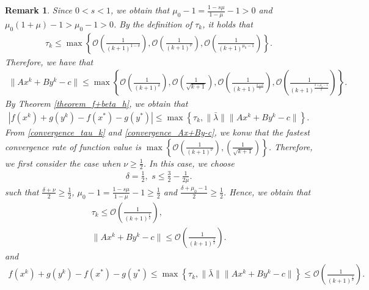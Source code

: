 \documentclass{article}
\numberwithin{equation}{section}
\newtheorem{remark}{Remark}[theorem]
\begin{document}
\begin{remark}
Since $0<s<1$, we obtain that $\mu_0 -1 =\frac{1-s\mu}{1-\mu}-1 >0$ and $\mu_0(1+\mu)-1>\mu_0-1>0$. 
By the definition of $\tau_k$, it holds that 
\begin{align}
    \tau_k \leq \max\left\{ \mathcal{O}\left(\frac{1}{(k+1)^{1-\delta}}\right), 
    \mathcal{O}\left(\frac{1}{(k+1)^{\nu}}\right),\mathcal{O}\left(\frac{1}{(k+1)^{\mu_0-1}}\right) \right\}. \label{convergence_tau_k}
\end{align}
Therefore, we have that
\begin{align}
    \|Ax^k+ By^k -c\rVert \leq \max\left\{\mathcal{O}\left( \frac{1}{(k+1)^{\delta}} \right), 
    \mathcal{O}\left( \frac{1}{\sqrt{k+1}}\right), \mathcal{O}\left( \frac{1}{(k+1)^{\frac{\delta+\nu}{2}}}\right), 
    \mathcal{O}\left( \frac{1}{(k+1)^{\frac{\delta+\mu_0-1}{2}}}\right)\right\}. \label{convergence_Ax+By-c}
\end{align} 
By Theorem \ref{theorem_f+beta_h}, we obtain that 
\begin{align}
    \left|f(x^k)+g(y^k) -f(x^*) -g(y^*)\right| \leq \max\left\{ \tau_k, \|\bar{\lambda}\rVert\|Ax^k+By^k-c\rVert \right\}. \nonumber
\end{align}
From \eqref{convergence_tau_k} and \eqref{convergence_Ax+By-c}, we konw that the fastest convergence rate 
of function value is $\max\left\{ \mathcal{O}\left( \frac{1}{(k+1)^{\nu}} \right), \left( \frac{1}{\sqrt{k+1}} \right) \right\}$. 
Therefore, we first consider the case when $\nu \geq \frac{1}{2}$. 
In this case,  we choose
\begin{align}
    \delta = \frac{1}{2}, \hspace{4pt}  s\leq \frac{3}{2} -\frac{1}{2\mu}. 
\end{align}
such that $\frac{\delta+\nu}{2} \geq \frac{1}{2}$, $\mu_0-1=\frac{1-s\mu}{1-\mu}-1\geq \frac{1}{2}$ and 
$\frac{\delta+\mu_0-1}{2}\geq \frac{1}{2}$. 
Hence, we obtain that 
\begin{equation}
    \begin{array}{c}
        \tau_k \leq  \mathcal{O}\left( \frac{1}{(k+1)^{\frac{1}{2}}} \right), \nonumber \\
        \|Ax^k+ By^k -c\rVert \leq \mathcal{O} \left( \frac{1}{(k+1)^{\frac{1}{2}}} \right). \nonumber
    \end{array}
\end{equation}
and 
\begin{align}
    f(x^k)+g(y^k) -f(x^*) -g(y^*) \leq \max\left\{ \tau_k, \|\bar{\lambda}\rVert\|Ax^k+By^k-c\rVert \right\} 
    \leq \mathcal{O} \left( \frac{1}{(k+1)^{\frac{1}{2}}} \right). \nonumber 
\end{align}


\end{remark}
\end{document}
